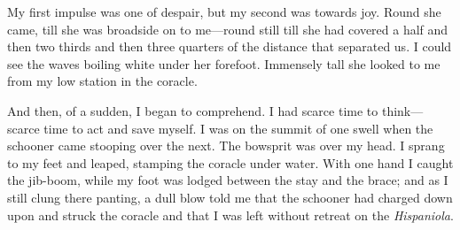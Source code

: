 My first impulse was one of despair, but my second was towards joy. Round she came, till she was broadside on to me---round still till she had covered a half and then two thirds and then three quarters of the distance that separated us. I could see the waves boiling white under her forefoot. Immensely tall she looked to me from my low station in the coracle.

And then, of a sudden, I began to comprehend. I had scarce time to think---scarce time to act and save myself. I was on the summit of one swell when the schooner came stooping over the next. The bowsprit was over my head. I sprang to my feet and leaped, stamping the coracle under water. With one hand I caught the jib-boom, while my foot was lodged between the stay and the brace; and as I still clung there panting, a dull blow told me that the schooner had charged down upon and struck the coracle and that I was left without retreat on the \textit{Hispaniola}.